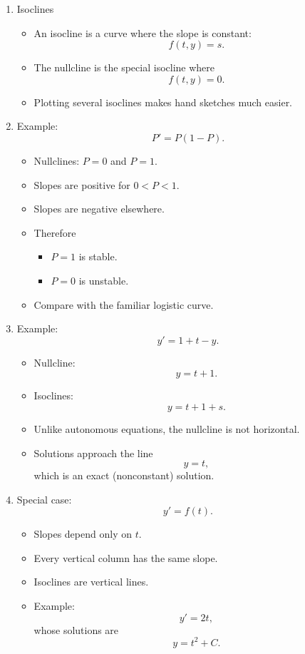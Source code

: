 \documentclass{article}
\begin{document}
\begin{enumerate}
\item Isoclines
\begin{itemize}
\item An isocline is a curve where the slope is constant:
\[
f(t,y)=s.
\]
\item The nullcline is the special isocline where
\[
f(t,y)=0.
\]
\item Plotting several isoclines makes hand sketches much easier.
\end{itemize}

\item Example:
\[
P'=P(1-P).
\]

\begin{itemize}
\item Nullclines: $P=0$ and $P=1$.
\item Slopes are positive for $0<P<1$.
\item Slopes are negative elsewhere.
\item Therefore
\begin{itemize}
\item $P=1$ is stable.
\item $P=0$ is unstable.
\end{itemize}
\item Compare with the familiar logistic curve.
\end{itemize}

\item Example:
\[
y'=1+t-y.
\]

\begin{itemize}
\item Nullcline:
\[
y=t+1.
\]
\item Isoclines:
\[
y=t+1+s.
\]
\item Unlike autonomous equations, the nullcline is not horizontal.
\item Solutions approach the line
\[
y=t,
\]
which is an exact (nonconstant) solution.
\end{itemize}

\item Special case:
\[
y'=f(t).
\]
\begin{itemize}
\item Slopes depend only on $t$.
\item Every vertical column has the same slope.
\item Isoclines are vertical lines.
\item Example:
\[
y'=2t,
\]
whose solutions are
\[
y=t^2+C.
\]
\end{itemize}


\end{enumerate}
\end{document}
